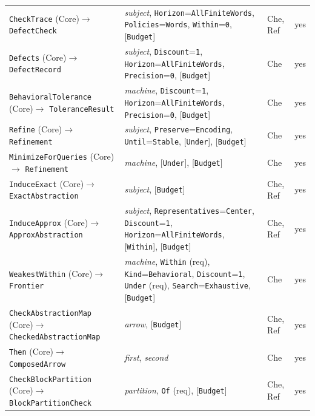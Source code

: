 \documentclass[11pt]{article}
\newcommand{\code}[1]{\texttt{#1}}
\theoremstyle{definition}
\theoremstyle{plain}
\begin{document}
{\begin{longtable}{>{\raggedright\arraybackslash}p{4.4cm}>{\raggedright\arraybackslash}p{6.8cm}>{\raggedright\arraybackslash}p{1.9cm}>{\raggedright\arraybackslash}p{0.5cm}}
\code{CheckTrace} (Core)\newline$\to$ \code{DefectCheck} & \emph{subject}, \code{Horizon}=\code{AllFiniteWords}, \code{Policies}=\code{Words}, \code{Within}=\code{0}, [\code{Budget}] & Che, Ref & yes\\
\code{Defects} (Core)\newline$\to$ \code{DefectRecord} & \emph{subject}, \code{Discount}=\code{1}, \code{Horizon}=\code{AllFiniteWords}, \code{Precision}=\code{0}, [\code{Budget}] & Che & yes\\
\code{BehavioralTolerance} (Core)\newline$\to$ \code{ToleranceResult} & \emph{machine}, \code{Discount}=\code{1}, \code{Horizon}=\code{AllFiniteWords}, \code{Precision}=\code{0}, [\code{Budget}] & Che & yes\\
\code{Refine} (Core)\newline$\to$ \code{Refinement} & \emph{subject}, \code{Preserve}=\code{Encoding}, \code{Until}=\code{Stable}, [\code{Under}], [\code{Budget}] & Che & yes\\
\code{MinimizeForQueries} (Core)\newline$\to$ \code{Refinement} & \emph{machine}, [\code{Under}], [\code{Budget}] & Che & yes\\
\code{InduceExact} (Core)\newline$\to$ \code{ExactAbstraction} & \emph{subject}, [\code{Budget}] & Che, Ref & yes\\
\code{InduceApprox} (Core)\newline$\to$ \code{ApproxAbstraction} & \emph{subject}, \code{Representatives}=\code{Center}, \code{Discount}=\code{1}, \code{Horizon}=\code{AllFiniteWords}, [\code{Within}], [\code{Budget}] & Che, Ref & yes\\
\code{WeakestWithin} (Core)\newline$\to$ \code{Frontier} & \emph{machine}, \code{Within} (req), \code{Kind}=\code{Behavioral}, \code{Discount}=\code{1}, \code{Under} (req), \code{Search}=\code{Exhaustive}, [\code{Budget}] & Che & yes\\
\code{CheckAbstractionMap} (Core)\newline$\to$ \code{CheckedAbstractionMap} & \emph{arrow}, [\code{Budget}] & Che, Ref & yes\\
\code{Then} (Core)\newline$\to$ \code{ComposedArrow} & \emph{first}, \emph{second} & Che & yes\\
\code{CheckBlockPartition} (Core)\newline$\to$ \code{BlockPartitionCheck} & \emph{partition}, \code{Of} (req), [\code{Budget}] & Che, Ref & yes\\

\end{longtable}}
\end{document}
